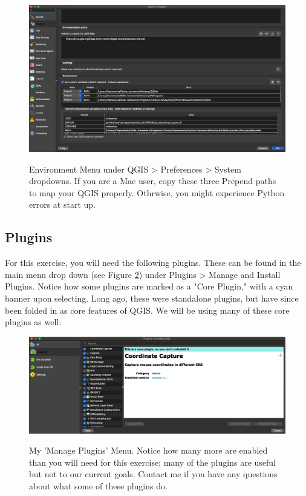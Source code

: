 \documentclass{article}
\begin{document}
\begin{figure}[htbp]
    \centering
    \includegraphics[width=\textwidth]{Figure3_Environment_Paths.png}
    \label{fig:fig3}
    \caption{Environment Menu under QGIS > Preferences > System dropdowns. If you are a Mac user, copy these three Prepend paths to map your QGIS properly. Othrwise, you might experience Python errors at start up.}
\end{figure}

\subsection{Plugins}

For this exercise, you will need the following plugins. These can be found in the main menu drop down (see Figure \ref{fig4}) under Plugins > Manage and Install Plugins. Notice how some plugins are marked as a "Core Plugin," with a cyan banner upon selecting. Long ago, these were standalone plugins, but have since been folded in as core features of QGIS. We will be using many of these core plugins as well:

\begin{figure}[htbp]
    \centering
    \includegraphics[width=\textwidth]{FIgure4_Plugin_Menu.png}
    \label{fig4}
    \caption{My 'Manage Plugins' Menu. Notice how many more are enabled than you will need for this exercise; many of the plugins are useful but not to our current goals. Contact me if you have any questions about what some of these plugins do.}
\end{figure}
\end{document}
